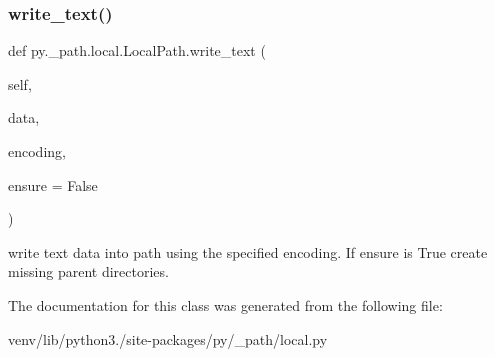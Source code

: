 \subsubsection{\texorpdfstring{write\+\_\+text()}{write\_text()}}
{\footnotesize\ttfamily def py.\+\_\+path.\+local.\+Local\+Path.\+write\+\_\+text (\begin{DoxyParamCaption}\item[{}]{self,  }\item[{}]{data,  }\item[{}]{encoding,  }\item[{}]{ensure = {\ttfamily False} }\end{DoxyParamCaption})}

\begin{DoxyVerb}write text data into path using the specified encoding.
If ensure is True create missing parent directories.
\end{DoxyVerb}
 

The documentation for this class was generated from the following file\+:\begin{DoxyCompactItemize}
\item 
venv/lib/python3./site-\/packages/py/\+\_\+path/local.\+py\end{DoxyCompactItemize}

